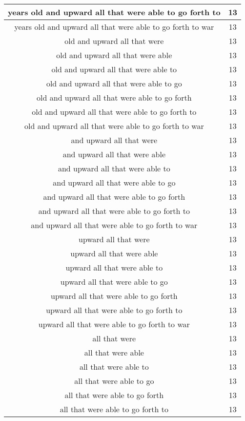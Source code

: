 \begin{center}
\begin{longtable}{|c|c|}
years old and upward all that were able to go forth to & 13\\ \hline 
years old and upward all that were able to go forth to war & 13\\ \hline 
old and upward all that were & 13\\ \hline 
old and upward all that were able & 13\\ \hline 
old and upward all that were able to & 13\\ \hline 
old and upward all that were able to go & 13\\ \hline 
old and upward all that were able to go forth & 13\\ \hline 
old and upward all that were able to go forth to & 13\\ \hline 
old and upward all that were able to go forth to war & 13\\ \hline 
and upward all that were & 13\\ \hline 
and upward all that were able & 13\\ \hline 
and upward all that were able to & 13\\ \hline 
and upward all that were able to go & 13\\ \hline 
and upward all that were able to go forth & 13\\ \hline 
and upward all that were able to go forth to & 13\\ \hline 
and upward all that were able to go forth to war & 13\\ \hline 
upward all that were & 13\\ \hline 
upward all that were able & 13\\ \hline 
upward all that were able to & 13\\ \hline 
upward all that were able to go & 13\\ \hline 
upward all that were able to go forth & 13\\ \hline 
upward all that were able to go forth to & 13\\ \hline 
upward all that were able to go forth to war & 13\\ \hline 
all that were & 13\\ \hline 
all that were able & 13\\ \hline 
all that were able to & 13\\ \hline 
all that were able to go & 13\\ \hline 
all that were able to go forth & 13\\ \hline 
all that were able to go forth to & 13\\ \hline 

\end{longtable}
\end{center}
